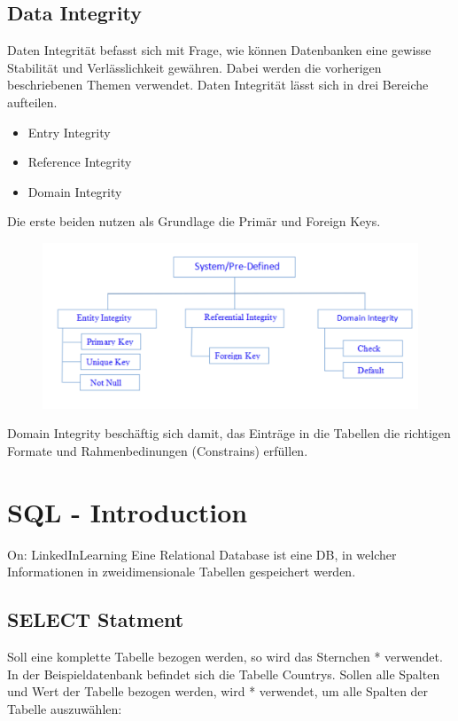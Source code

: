 \subsection{Data Integrity}
Daten Integrität befasst sich mit Frage, wie können Datenbanken eine gewisse Stabilität und Verlässlichkeit gewähren. Dabei werden die vorherigen beschriebenen Themen verwendet.
Daten Integrität lässt sich in drei Bereiche aufteilen.
\begin{itemize}
\item Entry Integrity
\item Reference Integrity
\item Domain Integrity
\end{itemize}

Die erste beiden nutzen als Grundlage die Primär und Foreign Keys.

\begin{figure}[H]
	\centering
	\includegraphics[scale = 0.3]{attachment/chapter_3/Scc041}
	\caption{}
	\label{fig:Scc041}
\end{figure}

Domain Integrity beschäftig sich damit, das Einträge in die Tabellen die richtigen Formate und Rahmenbedinungen (Constrains) erfüllen. 


\section{SQL - Introduction}
On: LinkedInLearning
Eine Relational Database ist eine DB, in welcher Informationen in zweidimensionale Tabellen gespeichert werden.


\subsection{SELECT Statment}
Soll eine komplette Tabelle bezogen werden, so wird das Sternchen * verwendet. In der Beispieldatenbank befindet sich die Tabelle Countrys.
Sollen alle Spalten und Wert der Tabelle bezogen werden, wird * verwendet, um alle Spalten der Tabelle auszuwählen:

